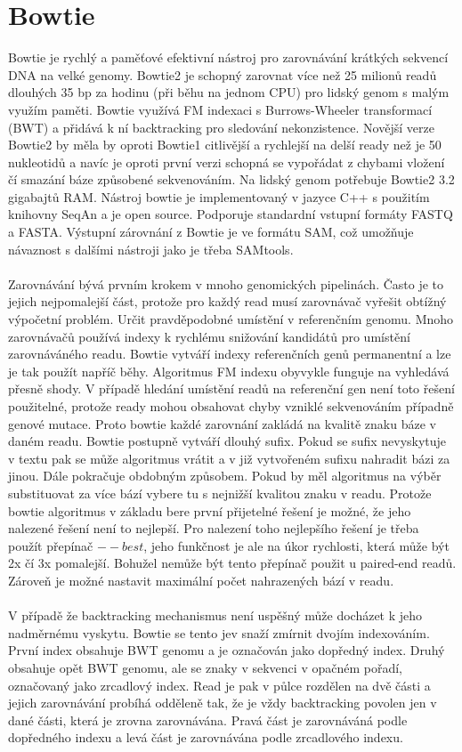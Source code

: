 \documentclass[czech,DP]{thesiskiv}
\numberwithin{equation}{section}
\begin{document}
\section{Bowtie}
Bowtie je rychlý a paměťové efektivní nástroj pro zarovnávání krátkých sekvencí DNA na velké genomy. Bowtie2 je schopný zarovnat více než 25 milionů readů dlouhých 35 bp za hodinu (při běhu na jednom CPU) pro lidský genom s malým využím paměti. Bowtie využívá FM indexaci s Burrows-Wheeler transformací (BWT) a přidává k ní backtracking pro sledování nekonzistence. Novější verze Bowtie2 by měla by oproti Bowtie1 citlivější a rychlejší na delší ready než je 50 nukleotidů a navíc je oproti první verzi schopná se vypořádat z chybami vložení čí smazání báze způsobené sekvenováním. Na lidský genom potřebuje Bowtie2 3.2 gigabajtů RAM. Nástroj bowtie je implementovaný v jazyce C++ s použitím knihovny SeqAn a je open source. Podporuje standardní vstupní formáty FASTQ a FASTA.  Výstupní zárovnání z Bowtie je ve formátu SAM, což umožňuje návaznost s dalšími nástroji jako je třeba SAMtools. \cite{bowtie} \cite{bowtie2}   
\\
\\
Zarovnávání bývá prvním krokem v mnoho genomických pipelinách. Často je to jejich nejpomalejší část, protože pro každý read musí zarovnávač vyřešit obtížný výpočetní problém. Určit pravděpodobné umístění v referenčním genomu. Mnoho zarovnávačů používá indexy k rychlému snižování kandidátů pro umístění zarovnáváného readu. Bowtie vytváří indexy referenčních genů permanentní a lze je tak použít napříč běhy. Algoritmus FM indexu obyvykle funguje na vyhledává přesně shody. V případě hledání umístění readů na referenční gen není toto řešení použitelné, protože ready mohou obsahovat chyby vzniklé sekvenováním případně genové mutace. Proto bowtie každé zarovnání zakládá na kvalitě znaku báze v daném readu. Bowtie postupně vytváří dlouhý sufix. Pokud se sufix nevyskytuje v textu pak se může algoritmus vrátit a v již vytvořeném sufixu nahradit bázi za jinou. Dále pokračuje obdobným způsobem. Pokud by měl algoritmus na výběr substituovat za více bází vybere tu s nejnižší kvalitou znaku v readu. Protože bowtie algoritmus v základu bere první přijetelné řešení je možné, že jeho nalezené řešení není to nejlepší. Pro nalezení toho nejlepšího řešení je třeba použít přepínač $--best$, jeho funkčnost je ale na úkor rychlosti, která může být 2x čí 3x pomalejší. Bohužel nemůže být tento přepínač použit u paired-end readů. Zároveň je možné nastavit maximální počet nahrazených bází v readu. \cite{bowtie}
\\
\\
V případě že backtracking mechanismus není uspěšný může docházet k jeho nadměrnému vyskytu. Bowtie se tento jev snaží zmírnit dvojím indexováním. První index obsahuje BWT genomu a je označován jako dopředný index. Druhý obsahuje opět BWT genomu, ale se znaky v sekvenci v opačném pořadí, označovaný jako zrcadlový index. Read je pak v půlce rozdělen na dvě části a jejich zarovnávání probíhá odděleně tak, že je vždy backtracking povolen jen v dané části, která je zrovna zarovnávána. Pravá část je zarovnáváná podle dopředného indexu a levá část je zarovnávána podle zrcadlového indexu. 
\end{document}
